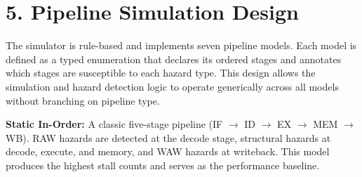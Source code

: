 \section*{5. Pipeline Simulation Design}





The simulator is rule-based and implements seven pipeline models. Each model is defined as a typed enumeration that declares its ordered stages and annotates which stages are susceptible to each hazard type. This design allows the simulation and hazard detection logic to operate generically across all models without branching on pipeline type.


\textbf{Static In-Order:} A classic five-stage pipeline (IF $\to$ ID $\to$ EX $\to$ MEM $\to$ WB). RAW hazards are detected at the decode stage, structural hazards at decode, execute, and memory, and WAW hazards at writeback. This model produces the highest stall counts and serves as the performance baseline.

